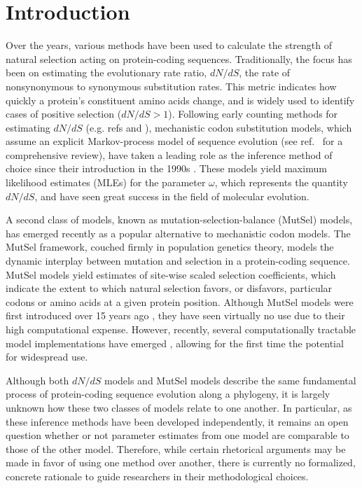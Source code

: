 \documentclass[11pt]{article}
\begin{document}
\section*{Introduction}

Over the years, various methods have been used to calculate the strength of natural selection acting on protein-coding sequences. Traditionally, the focus has been on estimating the evolutionary rate ratio, $dN/dS$, the rate of nonsynonymous to synonymous substitution rates. This metric indicates how quickly a protein's constituent amino acids change, and is widely used to identify cases of positive selection ($dN/dS > 1$). Following early counting methods for estimating $dN/dS$ (e.g. refs \cite{LWL85} and \cite{NG86}), mechanistic codon substitution models, which assume an explicit Markov-process model of sequence evolution (see ref.~\cite{Anisimova2009} for a comprehensive review), have taken a leading role as the inference method of choice since their introduction in the 1990s \cite{GoldmanYang1994, MuseGaut1994}. These models yield maximum likelihood estimates (MLEs) for the parameter $\omega$, which represents the quantity $dN/dS$, and have seen great success in the field of molecular evolution. 

A second class of models, known as mutation-selection-balance (MutSel) models, has emerged recently as a popular alternative to mechanistic codon models. The MutSel framework, couched firmly in population genetics theory, models the dynamic interplay between mutation and selection in a protein-coding sequence. MutSel models yield estimates of site-wise scaled selection coefficients, which indicate the extent to which natural selection favors, or disfavors, particular codons or amino acids at a given protein position. Although MutSel models were first introduced over 15 years ago \cite{HalpernBruno1998}, they have seen virtually no use due to their high computational expense. However, recently, several computationally tractable model implementations have emerged \cite{RodrigueLartillot2014,Tamurietal2014}, allowing for the first time the potential for widespread use. 

Although both $dN/dS$ models and MutSel models describe the same fundamental process of protein-coding sequence evolution along a phylogeny, it is largely unknown how these two classes of models relate to one another. In particular, as these inference methods have been developed independently, it remains an open question whether or not parameter estimates from one model are comparable to those of the other model. Therefore, while certain rhetorical arguments may be made in favor of using one method over another, there is currently no formalized, concrete rationale to guide researchers in their methodological choices. 
\end{document}
